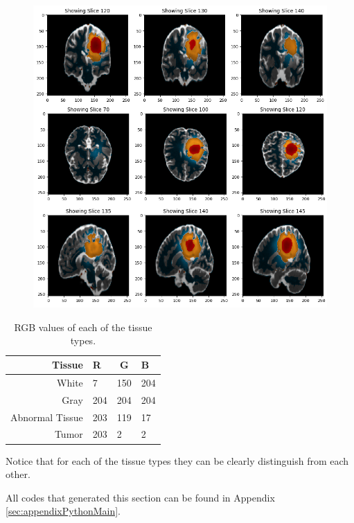 \begin{figure}[H]
  \centering
  \includegraphics[width=\linewidth]{img/colourCodedRegions.png}
  \caption{}
  \label{fig:colourCodedRegions}
\end{figure}

\begin{table}[h]
\centering
\begin{tabular}{|r|l|l|l|}
\hline
Tissue & R & \multicolumn{1}{c|}{G} & B \\ \hline
White & 7 & \multicolumn{1}{c|}{150} & 204 \\ \hline
Gray & 204 & 204 & 204 \\ \hline
Abnormal Tissue & 203 & 119 & 17 \\ \hline
Tumor & 203 & 2 & 2 \\ \hline
\end{tabular}
\caption{RGB values of each of the tissue types.}
\label{table:RGBValues}
\end{table}

Notice that for each of the tissue types they can be clearly distinguish from each other. 

All codes that generated this section can be found in Appendix \ref{sec:appendixPythonMain}.